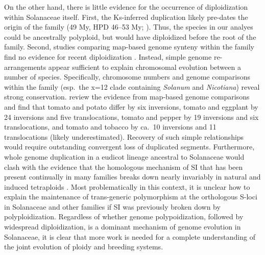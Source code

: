 On the other hand, there is little evidence for the occurrence of diploidization within Solanaceae itself.
First, the Ks-inferred duplication \citep{tomato2012} likely pre-dates the origin of the family (49 My, HPD 46--53 My; \citealt{sarkinen_2013}). 
Thus, the species in our analyes could be ancestrally polyploid, but would have diploidized before the root of the family.
Second, studies comparing map-based genome synteny within the family find no evidence for recent diploidization \citep{wu_2010a}.
Instead, simple genome re-arrangements appear sufficient to explain chromosomal evolution between a number of species. %
Specifically, chromosome numbers and genome comparisons within the family (esp.\ the x=12 clade containing \textit{Solanum} and \textit{Nicotiana}) reveal strong conservation.
\citet{wu_2010a} review the evidence from map-based genome comparisons and find that tomato and potato differ by six inversions, tomato and eggplant by 24 inversions and five translocations, tomato and pepper by 19 inversions and six translocations, and tomato and tobacco by ca.\ 10 inversions and 11 translocations (likely underestimated).
Recovery of such simple relationships would require outstanding convergent loss of duplicated segments.
%
Furthermore, whole genome duplication in a eudicot lineage ancestral to Solanaceae would clash with the evidence that the homologous mechanism of SI that has been present continually in many families \citep{igic_2006} breaks down nearly invariably in natural and induced tetraploids \citep{stone_2002, mcclure_2009}.
Most problematically in this context, it is unclear how to explain the maintenance of trans-generic polymorphism at the orthologous S-loci in Solanaceae and other families if SI was previously broken down by polyploidization.
%
Regardless of whether genome polypoidization, followed by widespread diploidization, is a dominant mechanism of genome evolution in Solanaceae, it is clear that more work is needed for a complete understanding of the joint evolution of ploidy and breeding systems.


